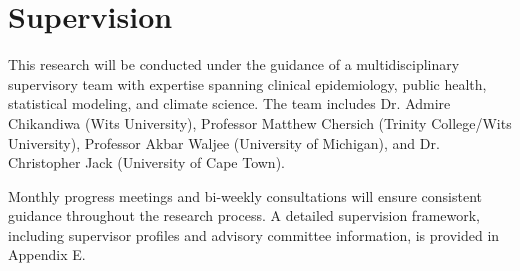 \section{Supervision}

This research will be conducted under the guidance of a multidisciplinary supervisory team with expertise spanning clinical epidemiology, public health, statistical modeling, and climate science. The team includes Dr. Admire Chikandiwa (Wits University), Professor Matthew Chersich (Trinity College/Wits University), Professor Akbar Waljee (University of Michigan), and Dr. Christopher Jack (University of Cape Town).

Monthly progress meetings and bi-weekly consultations will ensure consistent guidance throughout the research process. A detailed supervision framework, including supervisor profiles and advisory committee information, is provided in Appendix E.
